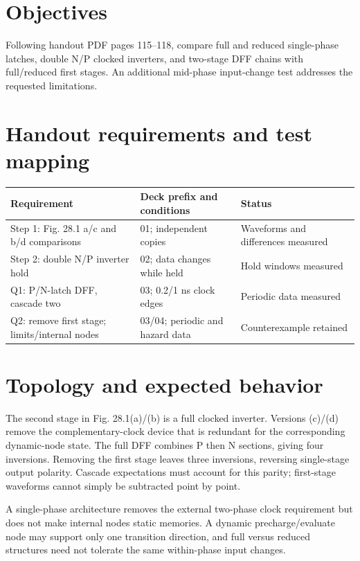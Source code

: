 \section{Objectives}

Following handout PDF pages 115--118, compare full and reduced single-phase latches, double N/P clocked inverters, and two-stage DFF chains with full/reduced first stages. An additional mid-phase input-change test addresses the requested limitations.

\section{Handout requirements and test mapping}

\begin{center}
\small
\setlength{\tabcolsep}{4pt}
\begin{tabular}{p{.42\linewidth}p{.29\linewidth}p{.18\linewidth}}
\toprule
Requirement & Deck prefix and conditions & Status \\
\midrule
Step 1: Fig. 28.1 a/c and b/d comparisons & 01; independent copies & Waveforms and differences measured \\
Step 2: double N/P inverter hold & 02; data changes while held & Hold windows measured \\
Q1: P/N-latch DFF, cascade two & 03; 0.2/1 ns clock edges & Periodic data measured \\
Q2: remove first stage; limits/internal nodes & 03/04; periodic and hazard data & Counterexample retained \\
\bottomrule
\end{tabular}
\end{center}

\section{Topology and expected behavior}

The second stage in Fig. 28.1(a)/(b) is a full clocked inverter. Versions (c)/(d) remove the complementary-clock device that is redundant for the corresponding dynamic-node state. The full DFF combines P then N sections, giving four inversions. Removing the first stage leaves three inversions, reversing single-stage output polarity. Cascade expectations must account for this parity; first-stage waveforms cannot simply be subtracted point by point.

A single-phase architecture removes the external two-phase clock requirement but does not make internal nodes static memories. A dynamic precharge/evaluate node may support only one transition direction, and full versus reduced structures need not tolerate the same within-phase input changes.

